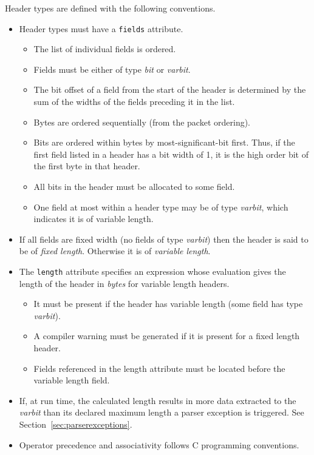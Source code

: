 \documentclass[12pt]{article}
\begin{document}
Header types are defined with the following conventions.
\begin{itemize}
\item
Header types must have a \texttt{fields} attribute. 
\begin{itemize}
\item
The list of individual fields is ordered.
\item
Fields must be either of type \textit{bit} or \textit{varbit}.
\item
The bit offset of a field from the start of the header is determined by the 
sum of the widths of the fields preceding it in the list.
\item
Bytes are ordered sequentially (from the packet ordering).
\item
Bits are ordered within bytes by most-significant-bit first.  Thus, if the 
first field listed in a header has a bit width of 1, it is the high order 
bit of the first byte in that header.
\item
All bits in the header must be allocated to some field.
\item
One field at most within a header type may be of type \textit{varbit}, which 
indicates it is of variable length.
\end{itemize}

\item
If all fields are fixed width (no fields of type \textit{varbit}) then the header is 
said to be of \textit{fixed length}. Otherwise it is of \textit{variable length}.
\item
The \texttt{length} attribute specifies an expression whose evaluation gives
the length  of the header in \textit{bytes} for variable length headers. 
\begin{itemize}
\item
It must be present if the header has variable length (some field has type  
\textit{varbit}).
\item
A compiler warning must be generated if it is present for a fixed length header.
\item
Fields referenced in the length attribute must be located before the variable 
length field.
\end{itemize}
\item
If, at run time, the calculated length results in more data extracted to
the \textit{varbit} than its declared maximum length a parser exception is
triggered. See Section~\ref{sec:parserexceptions}.

\item
Operator precedence and associativity follows C programming conventions.
\end{itemize}
\end{document}
